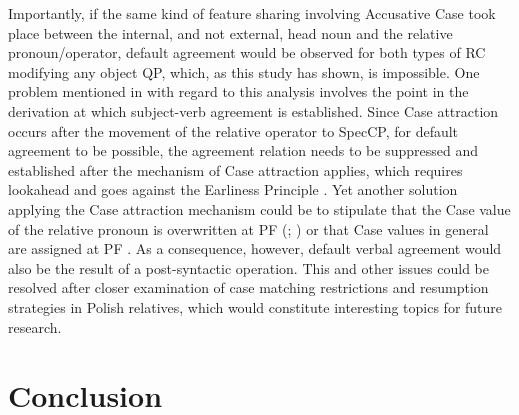 \documentclass[output=paper]{langsci/langscibook}
\begin{document}
Importantly, if the same kind of feature sharing involving Accusative Case took place between the internal, and not external, head noun and the relative pronoun\slash operator, default agreement would be observed for both types of RC modifying any object QP, which, as this study has shown, is impossible. One problem mentioned in \citet{Łęska2016} with regard to this analysis involves the point in the derivation at which subject-verb agreement is established. Since Case attraction occurs after the movement of the relative operator to SpecCP, for default agreement to be possible, the agreement relation needs to be suppressed and established after the mechanism of Case attraction applies, which requires lookahead and goes against the Earliness Principle \citep{Pesetsky1989}. Yet another solution applying the Case attraction mechanism could be to stipulate that the Case value of the relative pronoun is overwritten at PF (\citealt[68–69]{Bianchi2000}; \citealt{Spyropoulos2011}) or that Case values in general are assigned at PF \citep{Alexiadou2007Syntactic,Assmann2014Matching}. As a consequence, however, default verbal agreement would also be the result of a post-syntactic operation. This and other issues could be resolved after closer examination of case matching restrictions and resumption strategies in Polish relatives, which would constitute interesting topics for future research.

\section{Conclusion}%
\end{document}
